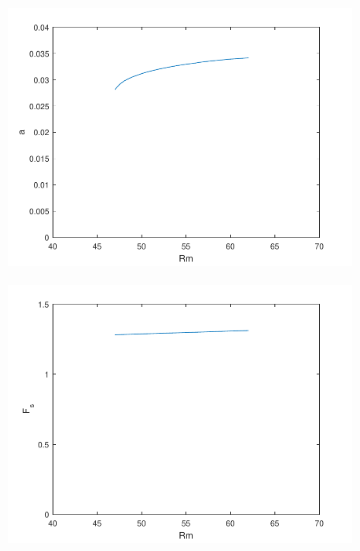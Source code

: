 \documentclass[11pt]{proc}
\begin{document}
 
  \begin{figure}[ht!]
\centering
\begin{subfigure}[t]{.48\linewidth}
    \centering
    \includegraphics[width=\textwidth]{Rm-a-H0-25R0-34}
    \caption{}
    \label{fig:steady-state-Rm-a}
 \end{subfigure}
 \quad
 \begin{subfigure}[t]{.48\linewidth}
    \centering
    \includegraphics[width=\textwidth]{Rm-flux-H0-25R0-34}
    \caption{}
    \label{fig:steady-state-Rm-flux}
 \end{subfigure}
\quad
  \begin{subfigure}[t]{.48\linewidth}
    \centering

\end{subfigure}
\end{figure}
\end{document}
